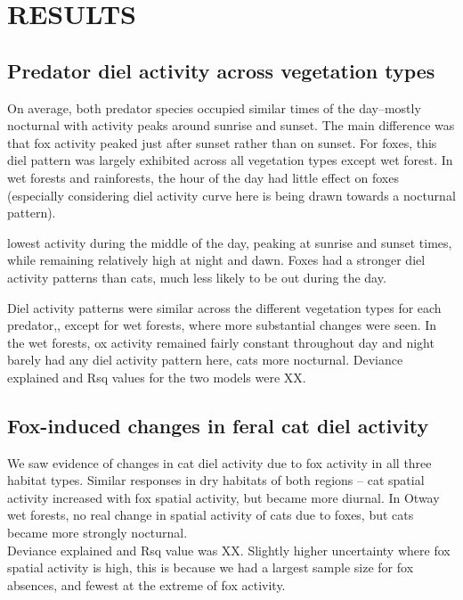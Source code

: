 \documentclass[]{elsarticle} %
\begin{document}
\newpage

\hypertarget{results}{%
\section{RESULTS}\label{results}}

\hypertarget{predator-diel-activity-across-vegetation-types}{%
\subsection{Predator diel activity across vegetation types}\label{predator-diel-activity-across-vegetation-types}}

On average, both predator species occupied similar times of the day--mostly nocturnal with activity peaks around sunrise and sunset. The main difference was that fox activity peaked just after sunset rather than on sunset. For foxes, this diel pattern was largely exhibited across all vegetation types except wet forest. In wet forests and rainforests, the hour of the day had little effect on foxes (especially considering diel activity curve here is being drawn towards a nocturnal pattern).

lowest activity during the middle of the day, peaking at sunrise and sunset times, while remaining relatively high at night and dawn.
Foxes had a stronger diel activity patterns than cats, much less likely to be out during the day.

Diel activity patterns were similar across the different vegetation types for each predator,, except for wet forests, where more substantial changes were seen. In the wet forests, ox activity remained fairly constant throughout day and night barely had any diel activity pattern here, cats more nocturnal.
Deviance explained and Rsq values for the two models were XX.

\hypertarget{fox-induced-changes-in-feral-cat-diel-activity}{%
\subsection{Fox-induced changes in feral cat diel activity}\label{fox-induced-changes-in-feral-cat-diel-activity}}

We saw evidence of changes in cat diel activity due to fox activity in all three habitat types. Similar responses in dry habitats of both regions -- cat spatial activity increased with fox spatial activity, but became more diurnal.
In Otway wet forests, no real change in spatial activity of cats due to foxes, but cats became more strongly nocturnal.\\
Deviance explained and Rsq value was XX.
Slightly higher uncertainty where fox spatial activity is high, this is because we had a largest sample size for fox absences, and fewest at the extreme of fox activity.
\end{document}
